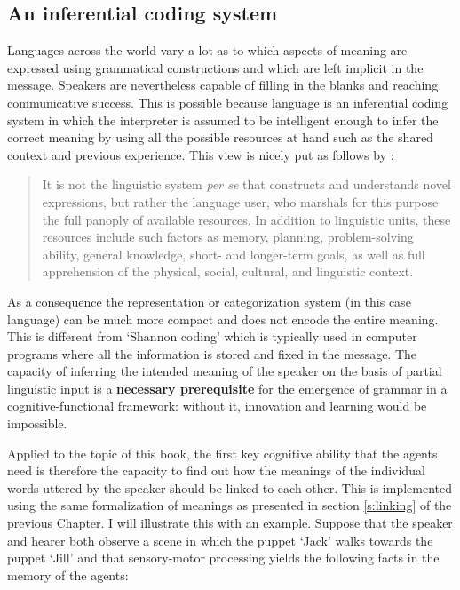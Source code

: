 \subsection{An inferential coding system}

Languages across the world vary a lot as to which aspects of meaning are expressed using grammatical constructions and which are left implicit in the message. Speakers are nevertheless capable of filling in the blanks and reaching communicative success. This is possible because language is an inferential coding system \citep{sperber86relevance} in which the interpreter is assumed to be intelligent enough to infer the correct meaning by using all the possible resources at hand such as the shared context and previous experience. This view is nicely put as follows by \citet[9]{langacker00dynamic}:

\begin{quote}
It is not the linguistic system {\em per se} that constructs and understands novel expressions, but rather the language user, who marshals for this purpose the full panoply of available resources. In addition to linguistic units, these resources include such factors as memory, planning, problem-solving ability, general knowledge, short- and longer-term goals, as well as full apprehension of the physical, social, cultural, and linguistic context.
\end{quote}

As a consequence the representation or categorization system (in this case language) can be much more compact and does not encode the entire meaning. This is different from `Shannon coding' which is typically used in computer programs where all the information is stored and fixed in the message. The capacity of inferring the intended meaning of the speaker on the basis of partial linguistic input is a {\bfseries necessary prerequisite} for the emergence of grammar in a cognitive-functional framework: without it, innovation and learning would be impossible.

Applied to the topic of this book, the first key cognitive ability that the agents need is therefore the capacity to find out how the meanings of the individual words uttered by the speaker should be linked to each other. This is implemented using the same formalization of meanings as presented in section \ref{s:linking} of the previous Chapter. I will illustrate this with an example. Suppose that the speaker and hearer both observe a scene in which the puppet `Jack' walks towards the puppet `Jill' and that sensory-motor processing yields the following facts in the memory of the agents:

